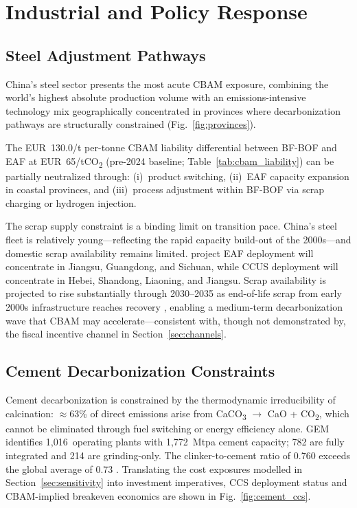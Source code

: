 \documentclass[letterpaper, 10pt, conference]{ieeeconf}
\begin{document}
\section{Industrial and Policy Response}
\label{sec:response}

\subsection{Steel Adjustment Pathways}
\label{sec:steel}

China's steel sector presents the most acute CBAM exposure, combining
the world's highest absolute production volume with an
emissions-intensive technology mix geographically concentrated in
provinces where decarbonization pathways are structurally constrained
(Fig.~\ref{fig:provinces}).

The EUR~130.0/t per-tonne CBAM liability differential between BF-BOF
and EAF at EUR~65/tCO\textsubscript{2} (pre-2024 baseline;
Table~\ref{tab:cbam_liability}) can be partially neutralized
through: (i)~product switching, (ii)~EAF capacity expansion in coastal
provinces, and (iii)~process adjustment within BF-BOF via scrap
charging or hydrogen injection.

The scrap supply constraint is a binding limit on transition pace.
China's steel fleet is relatively young---reflecting the rapid
capacity build-out of the 2000s---and domestic scrap availability
remains limited. \citet{Chen2023} project EAF deployment will
concentrate in Jiangsu, Guangdong, and Sichuan, while CCUS deployment
will concentrate in Hebei, Shandong, Liaoning, and Jiangsu.
Scrap availability is projected to rise substantially through
2030--2035 as end-of-life scrap from early 2000s infrastructure
reaches recovery \citep{IEA2023}, enabling a medium-term
decarbonization wave that CBAM may accelerate---consistent with, though
not demonstrated by, the fiscal incentive channel in Section~\ref{sec:channels}.

\subsection{Cement Decarbonization Constraints}

Cement decarbonization is constrained by the thermodynamic
irreducibility of calcination: $\approx$63\% of direct emissions
arise from CaCO\textsubscript{3} $\rightarrow$ CaO +
CO\textsubscript{2}, which cannot be eliminated through fuel switching
or energy efficiency alone. GEM identifies 1,016~operating plants
with 1,772~Mtpa cement capacity; 782 are fully integrated and 214 are
grinding-only. The clinker-to-cement ratio of 0.760 exceeds the
global average of 0.73 \citep{GCCA2024}. Translating the cost
exposures modelled in Section~\ref{sec:sensitivity} into investment
imperatives, CCS deployment status and CBAM-implied breakeven
economics are shown in Fig.~\ref{fig:cement_ccs}.
\end{document}

